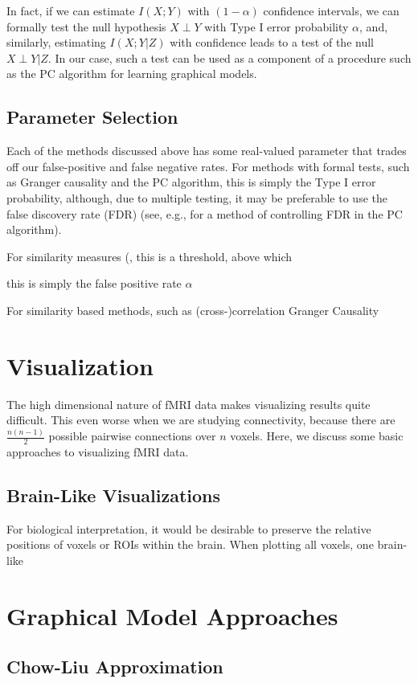 \documentclass[11pt]{article}
\begin{document}
In fact, if we can estimate $I(X;Y)$ with $(1 - \alpha)$ confidence intervals,
we can formally test the null hypothesis $X \perp Y$ with Type I error
probability $\alpha$, and, similarly, estimating $I(X;Y|Z)$ with confidence
leads to a test of the null $X \perp Y | Z$. In our case, such a test can be
used as a component of a procedure such as the PC algorithm
\cite{spirtes2000causation} for learning graphical models.

\subsection{Parameter Selection}
Each of the methods discussed above has some real-valued parameter that trades
off our false-positive and false negative rates. For methods with formal tests,
such as Granger causality and the PC algorithm, this is simply the Type I error
probability, although, due to multiple testing, it may be preferable to use the
false discovery rate (FDR) (see, e.g., \cite{Li08connectivityFDRcontrolledPC}
for a method of controlling FDR in the PC algorithm).

For similarity measures (, this is a threshold, above which


this is simply the false positive rate $\alpha$ 

For similarity based methods, such as (cross-)correlation 
Granger Causality


\section{Visualization}
The high dimensional nature of fMRI data makes visualizing results quite
difficult. This even worse when we are studying connectivity, because there are
$\frac{n(n - 1)}{2}$ possible pairwise connections over $n$ voxels. Here, we
discuss some basic approaches to visualizing fMRI data.

\subsection{Brain-Like Visualizations}
For biological interpretation, it would be desirable to preserve the relative
positions of voxels or ROIs within the brain. When plotting all voxels, one
brain-like

\section{Graphical Model Approaches}
\subsection{Chow-Liu Approximation}
\end{document}
